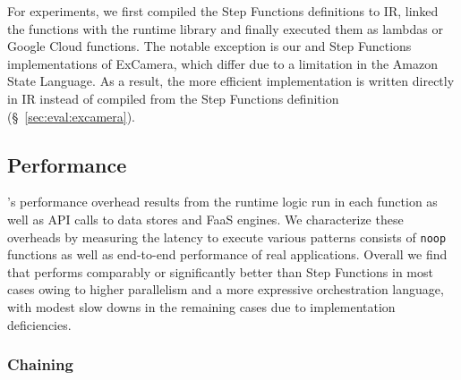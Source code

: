  For \name{} experiments, we
first compiled the Step Functions definitions to \name{} IR, linked the
functions with the \name{} runtime library and finally executed them as
lambdas or Google Cloud functions. The notable exception is our \name{} and
Step Functions implementations of ExCamera, which differ due to a limitation
in the Amazon State Language. As a result, the more efficient \name {}
implementation is written directly in \name{} IR instead of compiled from the
Step Functions definition (\S~\ref{sec:eval:excamera}).

\subsection{Performance}\label{sec:eval:micro}

\name{}'s performance overhead results from the \name{} runtime logic run in
each function as well as API calls to data stores and FaaS engines. We
characterize these overheads by measuring the latency to execute various
patterns consists of \texttt{noop} functions as well as end-to-end performance
of real applications. Overall we find that \name{} performs comparably or
significantly better than Step Functions in most cases owing to higher
parallelism and a more expressive orchestration language, with modest slow
downs in the remaining cases due to implementation deficiencies.

\subsubsection{Chaining}\label{sec:eval:chain}

